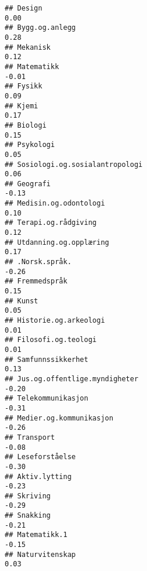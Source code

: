 \documentclass[
]{article}
\begin{document}
\begin{verbatim}
## Design                                                                            0.00
## Bygg.og.anlegg                                                                    0.28
## Mekanisk                                                                          0.12
## Matematikk                                                                       -0.01
## Fysikk                                                                            0.09
## Kjemi                                                                             0.17
## Biologi                                                                           0.15
## Psykologi                                                                         0.05
## Sosiologi.og.sosialantropologi                                                    0.06
## Geografi                                                                         -0.13
## Medisin.og.odontologi                                                             0.10
## Terapi.og.rådgiving                                                               0.12
## Utdanning.og.opplæring                                                            0.17
## .Norsk.språk.                                                                    -0.26
## Fremmedspråk                                                                      0.15
## Kunst                                                                             0.05
## Historie.og.arkeologi                                                             0.01
## Filosofi.og.teologi                                                               0.01
## Samfunnssikkerhet                                                                 0.13
## Jus.og.offentlige.myndigheter                                                    -0.20
## Telekommunikasjon                                                                -0.31
## Medier.og.kommunikasjon                                                          -0.26
## Transport                                                                        -0.08
## Leseforståelse                                                                   -0.30
## Aktiv.lytting                                                                    -0.23
## Skriving                                                                         -0.29
## Snakking                                                                         -0.21
## Matematikk.1                                                                     -0.15
## Naturvitenskap                                                                    0.03

\end{verbatim}
\end{document}
